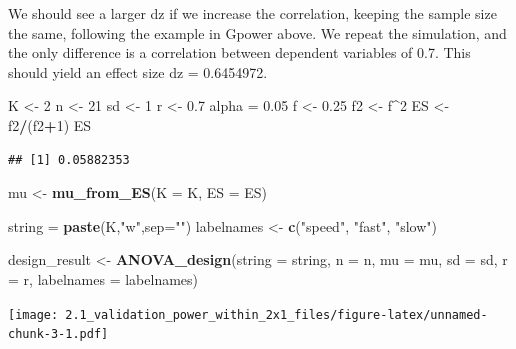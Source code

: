 \documentclass[]{article}
\newenvironment{Shaded}{\begin{snugshade}}{\end{snugshade}}
\newcommand{\KeywordTok}[1]{\textcolor[rgb]{0.13,0.29,0.53}{\textbf{#1}}}
\newcommand{\DataTypeTok}[1]{\textcolor[rgb]{0.13,0.29,0.53}{#1}}
\newcommand{\DecValTok}[1]{\textcolor[rgb]{0.00,0.00,0.81}{#1}}
\newcommand{\FloatTok}[1]{\textcolor[rgb]{0.00,0.00,0.81}{#1}}
\newcommand{\StringTok}[1]{\textcolor[rgb]{0.31,0.60,0.02}{#1}}
\newcommand{\OperatorTok}[1]{\textcolor[rgb]{0.81,0.36,0.00}{\textbf{#1}}}
\newcommand{\NormalTok}[1]{#1}
\begin{document}
We should see a larger dz if we increase the correlation, keeping the
sample size the same, following the example in Gpower above. We repeat
the simulation, and the only difference is a correlation between
dependent variables of 0.7. This should yield an effect size dz =
0.6454972.

\begin{Shaded}
\begin{Highlighting}[]
\NormalTok{K <-}\StringTok{ }\DecValTok{2}
\NormalTok{n <-}\StringTok{ }\DecValTok{21}
\NormalTok{sd <-}\StringTok{ }\DecValTok{1}
\NormalTok{r <-}\StringTok{ }\FloatTok{0.7}
\NormalTok{alpha =}\StringTok{ }\FloatTok{0.05}
\NormalTok{f <-}\StringTok{ }\FloatTok{0.25}
\NormalTok{f2 <-}\StringTok{ }\NormalTok{f}\OperatorTok{^}\DecValTok{2}
\NormalTok{ES <-}\StringTok{ }\NormalTok{f2}\OperatorTok{/}\NormalTok{(f2}\OperatorTok{+}\DecValTok{1}\NormalTok{)}
\NormalTok{ES}
\end{Highlighting}
\end{Shaded}

\begin{verbatim}
## [1] 0.05882353
\end{verbatim}

\begin{Shaded}
\begin{Highlighting}[]
\NormalTok{mu <-}\StringTok{ }\KeywordTok{mu_from_ES}\NormalTok{(}\DataTypeTok{K =}\NormalTok{ K, }\DataTypeTok{ES =}\NormalTok{ ES)}

\NormalTok{string =}\StringTok{ }\KeywordTok{paste}\NormalTok{(K,}\StringTok{"w"}\NormalTok{,}\DataTypeTok{sep=}\StringTok{""}\NormalTok{)}
\NormalTok{labelnames <-}\StringTok{ }\KeywordTok{c}\NormalTok{(}\StringTok{"speed"}\NormalTok{, }\StringTok{"fast"}\NormalTok{, }\StringTok{"slow"}\NormalTok{)}

\NormalTok{design_result <-}\StringTok{ }\KeywordTok{ANOVA_design}\NormalTok{(}\DataTypeTok{string =}\NormalTok{ string,}
                   \DataTypeTok{n =}\NormalTok{ n, }
                   \DataTypeTok{mu =}\NormalTok{ mu, }
                   \DataTypeTok{sd =}\NormalTok{ sd, }
                   \DataTypeTok{r =}\NormalTok{ r, }
                   \DataTypeTok{labelnames =}\NormalTok{ labelnames)}
\end{Highlighting}
\end{Shaded}

\texttt{[image: 2.1\_validation\_power\_within\_2x1\_files/figure-latex/unnamed-chunk-3-1.pdf]}

\begin{Shaded}
\end{Shaded}
\end{document}
